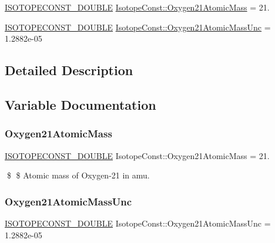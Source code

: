 \begin{DoxyCompactItemize}
\item 
\mbox{\hyperlink{group___isotope_const-_macros_ga8f45a7272ce02c0b4c65c44636ed719a}{I\+S\+O\+T\+O\+P\+E\+C\+O\+N\+S\+T\+\_\+\+D\+O\+U\+B\+LE}} \mbox{\hyperlink{group___isotope_const-_oxygen-_o21_ga266481c1c2036667c440d029113bdb24}{Isotope\+Const\+::\+Oxygen21\+Atomic\+Mass}} = 21.
\item 
\mbox{\hyperlink{group___isotope_const-_macros_ga8f45a7272ce02c0b4c65c44636ed719a}{I\+S\+O\+T\+O\+P\+E\+C\+O\+N\+S\+T\+\_\+\+D\+O\+U\+B\+LE}} \mbox{\hyperlink{group___isotope_const-_oxygen-_o21_ga62c52f5216d7f034b07f9191d810e176}{Isotope\+Const\+::\+Oxygen21\+Atomic\+Mass\+Unc}} = 1.\+2882e-\/05
\end{DoxyCompactItemize}


\subsection{Detailed Description}


\subsection{Variable Documentation}
\mbox{\label{group___isotope_const-_oxygen-_o21_ga266481c1c2036667c440d029113bdb24}} 
\subsubsection{\texorpdfstring{Oxygen21\+Atomic\+Mass}{Oxygen21AtomicMass}}
{\footnotesize\ttfamily \mbox{\hyperlink{group___isotope_const-_macros_ga8f45a7272ce02c0b4c65c44636ed719a}{I\+S\+O\+T\+O\+P\+E\+C\+O\+N\+S\+T\+\_\+\+D\+O\+U\+B\+LE}} Isotope\+Const\+::\+Oxygen21\+Atomic\+Mass = 21.}

\$ \$ Atomic mass of Oxygen-\/21 in amu. \mbox{\label{group___isotope_const-_oxygen-_o21_ga62c52f5216d7f034b07f9191d810e176}} 
\subsubsection{\texorpdfstring{Oxygen21\+Atomic\+Mass\+Unc}{Oxygen21AtomicMassUnc}}
{\footnotesize\ttfamily \mbox{\hyperlink{group___isotope_const-_macros_ga8f45a7272ce02c0b4c65c44636ed719a}{I\+S\+O\+T\+O\+P\+E\+C\+O\+N\+S\+T\+\_\+\+D\+O\+U\+B\+LE}} Isotope\+Const\+::\+Oxygen21\+Atomic\+Mass\+Unc = 1.\+2882e-\/05}

